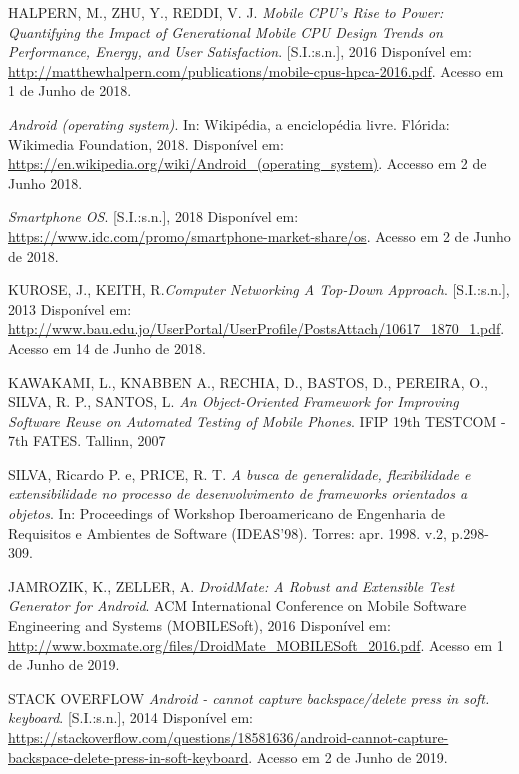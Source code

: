 \documentclass[
    12pt,       %
    openright,      %
    twoside,      %
    a4paper,      %
    english,      %
    french,       %
    spanish,      %
    brazil,       %
    ]{abntex2}
\begin{document}
  \noindent
  HALPERN, M., ZHU, Y., REDDI, V. J. \textit{Mobile CPU’s Rise to Power: Quantifying the Impact of Generational Mobile CPU Design Trends on Performance, Energy, and User Satisfaction}.
  [S.I.:s.n.], 2016 Disponível em: \url{http://matthewhalpern.com/publications/mobile-cpus-hpca-2016.pdf}. Acesso em 1 de Junho de 2018.

  \noindent
  \textit{Android (operating system)}. In: Wikipédia, a enciclopédia livre. Flórida: Wikimedia Foundation,
  2018. Disponível em:
  \url{https://en.wikipedia.org/wiki/Android_(operating_system)}. Accesso
  em 2 de Junho 2018.

  \noindent
  \textit{Smartphone OS}. [S.I.:s.n.], 2018 Disponível em: \url{https://www.idc.com/promo/smartphone-market-share/os}.
  Acesso em 2 de Junho de 2018.

  \noindent
  KUROSE, J., KEITH, R.\textit{Computer Networking A Top-Down Approach}. [S.I.:s.n.], 2013 Disponível em: \url{http://www.bau.edu.jo/UserPortal/UserProfile/PostsAttach/10617_1870_1.pdf}. Acesso em 14 de Junho de 2018.

  \noindent
  KAWAKAMI, L., KNABBEN A., RECHIA, D., BASTOS, D., PEREIRA, O., SILVA, R. P., SANTOS, L. \textit{An Object-Oriented Framework for Improving Software Reuse on Automated Testing of Mobile Phones}. IFIP 19th TESTCOM - 7th FATES. Tallinn, 2007

  \noindent
  SILVA, Ricardo P. e, PRICE, R. T. \textit{A busca de generalidade, flexibilidade e extensibilidade no processo de desenvolvimento de frameworks orientados a objetos}.
  In: Proceedings of Workshop Iberoamericano de Engenharia de Requisitos e Ambientes de Software (IDEAS'98). Torres: apr. 1998. v.2, p.298-309.

  \noindent
  JAMROZIK, K., ZELLER, A.  \textit{DroidMate: A Robust and Extensible Test Generator
  for Android}. ACM International Conference on Mobile Software Engineering and Systems (MOBILESoft), 2016 Disponível em: \url{http://www.boxmate.org/files/DroidMate_MOBILESoft_2016.pdf}. Acesso em 1 de Junho de 2019.

  \noindent
  STACK OVERFLOW \textit{Android - cannot capture backspace/delete press in soft. keyboard}. [S.I.:s.n.], 2014 Disponível em:
  \url{https://stackoverflow.com/questions/18581636/android-cannot-capture-backspace-delete-press-in-soft-keyboard}. Acesso em 2 de Junho de 2019.


\end{document}
